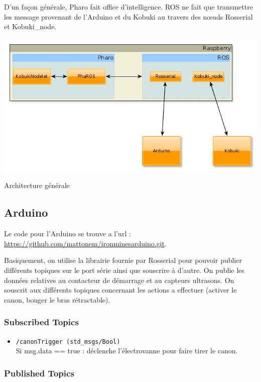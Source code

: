 \documentclass[a4paper, 11pt]{article}
\begin{document}
D'un façon générale, Pharo fait office d'intelligence. ROS ne fait que
transmettre les message provenant de l'Arduino et du Kobuki au travers
des n{\oe}uds Rosserial et Kobuki\_node.
\begin{center}
  \includegraphics[width=\linewidth]{./architecture.jpg}
  \caption{Architecture générale}
  \label{archi_generale}
\end{center}
\subsection{Arduino}
Le code pour l'Arduino se trouve a l'url
:\\ \url{https://github.com/mattonem/ironminesarduino.git}.

Basiquement, on utilise la librairie fournie par Rosserial pour
pouvoir publier différents topiques sur le port série ainsi que souscrire
à d'autre. On publie les données relatives au contacteur de démarrage
et au capteurs ultrasons. On souscrit aux différents topiques concernant
les actions a effectuer (activer le canon, bouger le bras
rétractable).

\subsubsection{Subscribed Topics}

\begin{itemize}
\item \texttt{/canonTrigger (std\_msgs/Bool)}\\ 
  Si msg.data == true :
  déclenche l'électrovanne pour faire tirer le canon.
\end{itemize}

\subsubsection{Published Topics}
\end{document}

